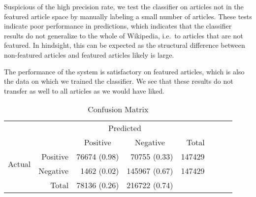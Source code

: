 Suspicious of the high precision rate, we test the classifier on articles not in the featured article space by manually labeling a small number of articles. These tests indicate poor performance in predictions, which indicates that the classifier results do not generalize to the whole of Wikipedia, i.e.\ to articles that are not featured. In hindsight, this can be expected as the structural difference between non-featured articles and featured articles likely is large.


The performance of the system is satisfactory on featured articles, which is also the data on which we trained the classifier. We see that these results do not transfer as well to all articles as we would have liked.



\begin{table}[tbp]
    \centering
     \begin{tabular}{rrrrrrrr}
      \toprule
      \multicolumn{2}{c}{} & \multicolumn{2}{c}{Predicted} & \\
      \cmidrule{3-4}
      \multicolumn{2}{c}{} & \multicolumn{1}{c}{Positive} & \multicolumn{1}{c}{Negative} & Total \\
      \midrule
      \multirow{2}{*}{Actual} & Positive & \num{76674} (0.98) & \num{70755} (0.33)  & \num{147429} \\
                              & Negative & \num{1462} (0.02)  & \num{145967} (0.67) & \num{147429} \\
                              \cmidrule{1-2}
                              & Total    & \num{78136} (0.26) & \num{216722} (0.74) \\
      \bottomrule
    \end{tabular}
    \caption[Confusion Matrix]{Confusion Matrix}%
    \label{tab:confusionmatrix}
\end{table}

